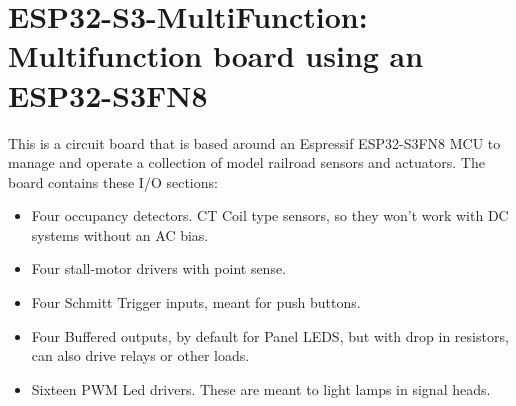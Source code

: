 %
%
%
%
% 
%
%
%
%
%
% 
%

\chapter{ESP32-S3-MultiFunction: Multifunction board using an ESP32-S3FN8}

This is a circuit board that is based around an Espressif ESP32-S3FN8 MCU to
manage and operate a collection of model railroad sensors and actuators. The 
board contains these I/O sections:

\begin{itemize}
\item Four occupancy detectors.  CT Coil type sensors, so they won't work with 
DC systems without an AC bias.
\item Four stall-motor drivers with point sense.
\item Four Schmitt Trigger inputs, meant for push buttons.
\item Four Buffered outputs, by default for Panel LEDS, but with drop in 
resistors, can also drive relays or other loads.
\item Sixteen PWM Led drivers.  These are meant to light lamps in signal 
heads.
\end{itemize}

